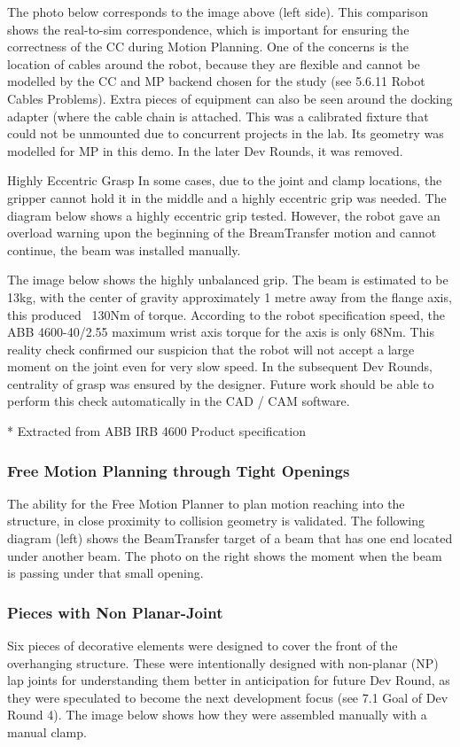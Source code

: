 The photo below corresponds to the image above (left side). This comparison shows the real-to-sim correspondence, which is important for ensuring the correctness of the CC during Motion Planning. One of the concerns is the location of cables around the robot, because they are flexible and cannot be modelled by the CC and MP backend chosen for the study (see 5.6.11 Robot Cables Problems).
Extra pieces of equipment can also be seen around the docking adapter (where the cable chain is attached. This was a calibrated fixture that could not be unmounted due to concurrent projects in the lab. Its geometry was modelled for MP in this demo. In the later Dev Rounds, it was removed.


Highly Eccentric Grasp 
In some cases, due to the joint and clamp locations, the gripper cannot hold it in the middle and a highly eccentric grip was needed. The diagram below shows a highly eccentric grip tested. However, the robot gave an overload warning upon the beginning of the BreamTransfer motion and cannot continue, the beam was installed manually. 

The image below shows the highly unbalanced grip. The beam is estimated to be 13kg, with the center of gravity approximately 1 metre away from the flange axis, this produced ~130Nm of torque. According to the robot specification speed, the ABB 4600-40/2.55 maximum wrist axis torque for the axis is only 68Nm. This reality check confirmed our suspicion that the robot will not accept a large moment on the joint even for very slow speed. In the subsequent Dev Rounds, centrality of grasp was ensured by the designer. Future work should be able to perform this check automatically in the CAD / CAM software.


* Extracted from ABB IRB 4600 Product specification 
\subsubsection{Free Motion Planning through Tight Openings}
The ability for the Free Motion Planner to plan motion reaching into the structure, in close proximity to collision geometry is validated. The following diagram (left) shows the BeamTransfer target of a beam that has one end located under another beam. The photo on the right shows the moment when the beam is passing under that small opening. 


\subsubsection{Pieces with Non Planar-Joint}
Six pieces of decorative elements were designed to cover the front of the overhanging structure. These were intentionally designed with non-planar (NP) lap joints for understanding them better in anticipation for future Dev Round, as they were speculated to become the next development focus (see 7.1 Goal of Dev Round 4). The image below shows how they were assembled manually with a manual clamp. 

